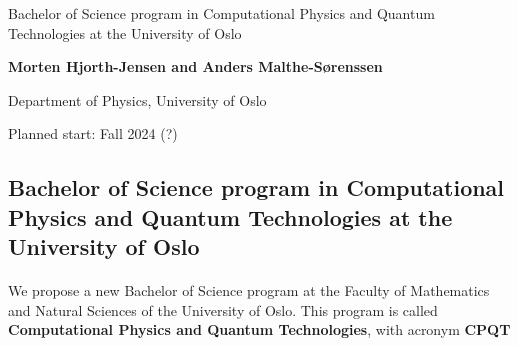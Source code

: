 \documentclass[%
oneside,                 %
final,                   %
10pt]{article}
\begin{document}

\newcommand{\exercisesection}[1]{\subsection*{#1}}






\thispagestyle{empty}

\begin{center}
{\LARGE\bf
\begin{spacing}{1.25}
Bachelor of Science program in Computational Physics and Quantum Technologies  at the University of Oslo
\end{spacing}
}
\end{center}


\begin{center}
{\bf Morten Hjorth-Jensen and Anders Malthe-Sørenssen}
\end{center}

    \begin{center}
\centerline{{\small Department of Physics, University of Oslo}}
\end{center}
    


\begin{center}
Planned start: Fall 2024 (?)
\end{center}

\vspace{1cm}


\subsection*{Bachelor of Science program in Computational Physics and Quantum Technologies  at the University of Oslo}

\paragraph{}
We propose a new Bachelor of Science program at the Faculty of Mathematics and Natural Sciences of the University of Oslo. This program is called  \textbf{Computational Physics and Quantum Technologies}, with acronym  \textbf{CPQT}
\end{document}
